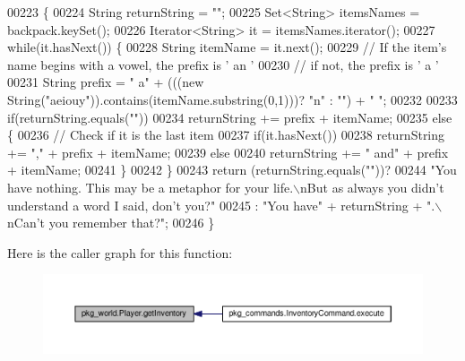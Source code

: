 \begin{DoxyCode}
00223                                  \{
00224         String returnString = \textcolor{stringliteral}{""};
00225         Set<String> itemsNames = backpack.keySet();
00226         Iterator<String> it = itemsNames.iterator();
00227         \textcolor{keywordflow}{while}(it.hasNext()) \{
00228             String itemName = it.next();
00229             \textcolor{comment}{// If the item's name begins with a vowel, the prefix is ' an '}
00230             \textcolor{comment}{// if not, the prefix is ' a '}
00231             String prefix = \textcolor{stringliteral}{" a"} + (((\textcolor{keyword}{new} String(\textcolor{stringliteral}{"aeiouy"})).contains(itemName.substring(0,1)))? \textcolor{stringliteral}{"n"} : \textcolor{stringliteral}{""}) +
       \textcolor{stringliteral}{" "};
00232 
00233             \textcolor{keywordflow}{if}(returnString.equals(\textcolor{stringliteral}{""}))
00234                 returnString += prefix + itemName;
00235             \textcolor{keywordflow}{else} \{
00236                 \textcolor{comment}{// Check if it is the last item}
00237                 \textcolor{keywordflow}{if}(it.hasNext())
00238                     returnString += \textcolor{stringliteral}{","} + prefix + itemName;
00239                 \textcolor{keywordflow}{else}
00240                     returnString += \textcolor{stringliteral}{" and"} + prefix + itemName;
00241             \}
00242         \}
00243         \textcolor{keywordflow}{return} (returnString.equals(\textcolor{stringliteral}{""}))?
00244             \textcolor{stringliteral}{"You have nothing. This may be a metaphor for your life.\(\backslash\)nBut as always you didn't understand a
       word I said, don't you?"}
00245             : \textcolor{stringliteral}{"You have"} + returnString + \textcolor{stringliteral}{".\(\backslash\)nCan't you remember that?"};
00246     \}
\end{DoxyCode}


Here is the caller graph for this function\-:
\nopagebreak
\begin{figure}[H]
\begin{center}
\leavevmode
\includegraphics[width=350pt]{classpkg__world_1_1Player_a2a6e491f41e159bbac42022e55df2d52_icgraph}
\end{center}
\end{figure}


